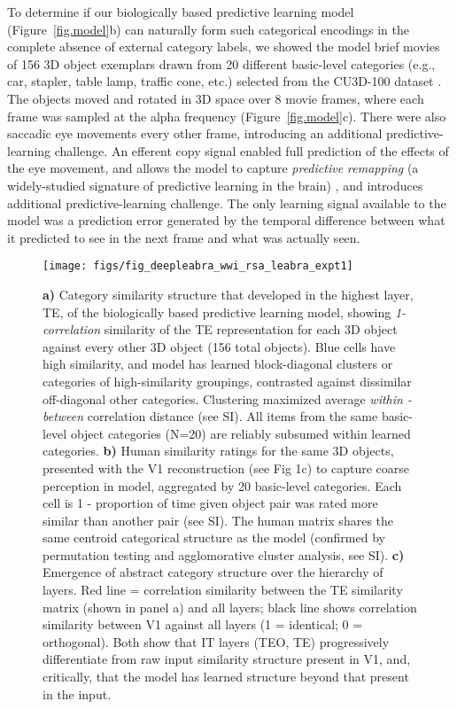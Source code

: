 \documentclass[12pt,twoside,lineno]{pnas-new}  %
\begin{document}
To determine if our biologically based predictive learning model (Figure~\ref{fig.model}b) can naturally form such categorical encodings in the complete absence of external category labels, we showed the model brief movies of 156 3D object exemplars drawn from 20 different basic-level categories (e.g., car, stapler, table lamp, traffic cone, etc.) selected from the CU3D-100 dataset \cite{OReillyWyatteHerdEtAl13}.  The objects moved and rotated in 3D space over 8 movie frames, where each frame was sampled at the alpha frequency (Figure~\ref{fig.model}c).  There were also saccadic eye movements every other frame, introducing an additional predictive-learning challenge.  An efferent copy signal enabled full prediction of the effects of the eye movement, and allows the model to capture {\em predictive remapping} (a widely-studied signature of predictive learning in the brain) \cite{DuhamelColbyGoldberg92,CavanaghHuntAfrazEtAl10}, and introduces additional predictive-learning challenge.  The only learning signal available to the model was a prediction error generated by the temporal difference between what it predicted to see in the next frame and what was actually seen.

\begin{figure}
  \centering\texttt{[image: figs/fig\_deepleabra\_wwi\_rsa\_leabra\_expt1]}
  \caption{\small  {\bf a)} Category similarity structure that developed in the highest layer, TE, of the biologically based predictive learning model, showing {\em 1-correlation} similarity of the TE representation for each 3D object against every other 3D object (156 total objects). Blue cells have high similarity, and model has learned block-diagonal clusters or categories of high-similarity groupings, contrasted against dissimilar off-diagonal other categories.  Clustering maximized average {\em within - between} correlation distance (see SI).  All items from the same basic-level object categories (N=20) are reliably subsumed within learned categories. {\bf b)} Human similarity ratings for the same 3D objects, presented with the V1 reconstruction (see Fig 1c) to capture coarse perception in model, aggregated by 20 basic-level categories.  Each cell is 1 - proportion of time given object pair was rated more similar than another pair (see SI).  The human matrix shares the same centroid categorical structure as the model (confirmed by permutation testing and agglomorative cluster analysis, see SI).  {\bf c)} Emergence of abstract category structure over the hierarchy of layers.  Red line = correlation similarity between the TE similarity matrix (shown in panel a) and all layers; black line shows correlation similarity between V1 against all layers (1 = identical; 0 = orthogonal). Both show that IT layers (TEO, TE) progressively differentiate from raw input similarity structure present in V1, and, critically, that the model has learned structure beyond that present in the input.}
  \label{fig.rsa}
\end{figure}
\end{document}
